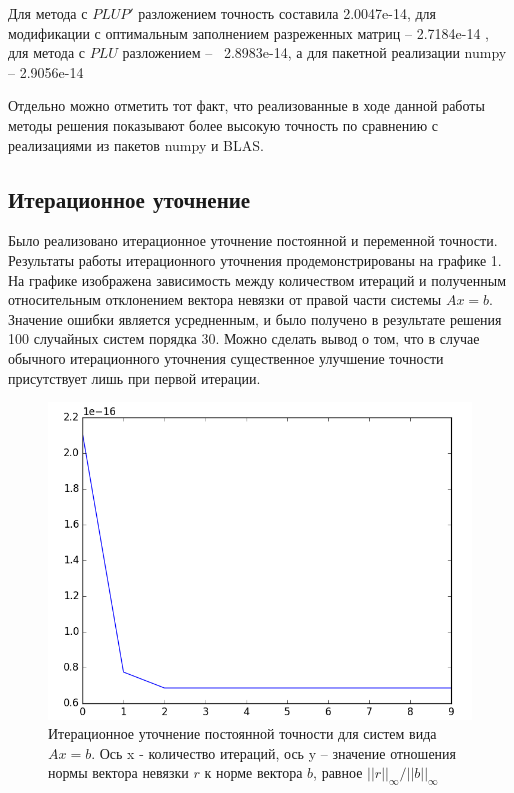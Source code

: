 Для метода с $PLUP'$ разложением точность составила 2.0047e-14, 
для модификации с оптимальным заполнением разреженных матриц – 2.7184e-14 ,
для метода с $PLU$ разложением –  2.8983e-14,
 а для пакетной реализации numpy –  2.9056e-14

Отдельно можно отметить тот факт, что реализованные в ходе данной работы методы решения показывают более высокую точность по сравнению с реализациями из пакетов numpy и BLAS.

\subsection{Итерационное уточнение}

Было реализовано итерационное уточнение постоянной и переменной точности. Результаты работы итерационного уточнения продемонстрированы на графике 1. На графике изображена зависимость между количеством итераций и полученным относительным отклонением вектора невязки от правой части системы $Ax=b$. Значение ошибки является усредненным, и было получено в результате решения 100 случайных систем порядка 30. Можно сделать вывод о том, что в случае обычного итерационного уточнения существенное улучшение точности присутствует лишь при первой итерации.
  
\begin{figure}[ht]
\includegraphics[width=\textwidth,height=\textheight,keepaspectratio]{iterative_refinement_crop}
\caption{Итерационное уточнение постоянной точности для систем вида $Ax=b$. Ось x - количество итераций, ось y – значение отношения нормы вектора невязки $r$ к норме вектора $b$, равное  $||r||_{\infty} / ||b||_{\infty}$}
\end{figure}

